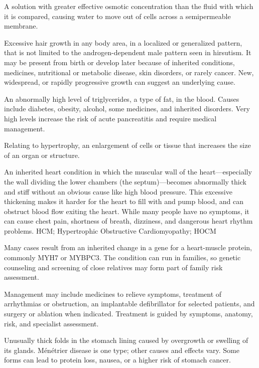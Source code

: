  A solution with greater effective osmotic concentration than the fluid with which it is compared, causing water to move out of cells across a semipermeable membrane.

 Excessive hair growth in any body area, in a localized or generalized pattern, that is not limited to the androgen-dependent male pattern seen in hirsutism. It may be present from birth or develop later because of inherited conditions, medicines, nutritional or metabolic disease, skin disorders, or rarely cancer. New, widespread, or rapidly progressive growth can suggest an underlying cause.

 An abnormally high level of triglycerides, a type of fat, in the blood. Causes include diabetes, obesity, alcohol, some medicines, and inherited disorders. Very high levels increase the risk of acute pancreatitis and require medical management.

 Relating to hypertrophy, an enlargement of cells or tissue that increases the size of an organ or structure.

 An inherited heart condition in which the muscular wall of the heart---especially the wall dividing the lower chambers (the septum)---becomes abnormally thick and stiff without an obvious cause like high blood pressure. This excessive thickening makes it harder for the heart to fill with and pump blood, and can obstruct blood flow exiting the heart. While many people have no symptoms, it can cause chest pain, shortness of breath, dizziness, and dangerous heart rhythm problems.
\synonyms
HCM; Hypertrophic Obstructive Cardiomyopathy; HOCM

 Many cases result from an inherited change in a gene for a heart-muscle protein, commonly MYH7 or MYBPC3. The condition can run in families, so genetic counseling and screening of close relatives may form part of family risk assessment.

 Management may include medicines to relieve symptoms, treatment of
arrhythmias or obstruction, an implantable defibrillator for selected patients, and surgery or ablation when indicated.
Treatment is guided by symptoms, anatomy, risk, and specialist assessment.

 Unusually thick folds in the stomach lining caused by overgrowth or swelling of its glands. Ménétrier disease is one type; other causes and effects vary. Some forms can lead to protein loss, nausea, or a higher risk of stomach cancer.

